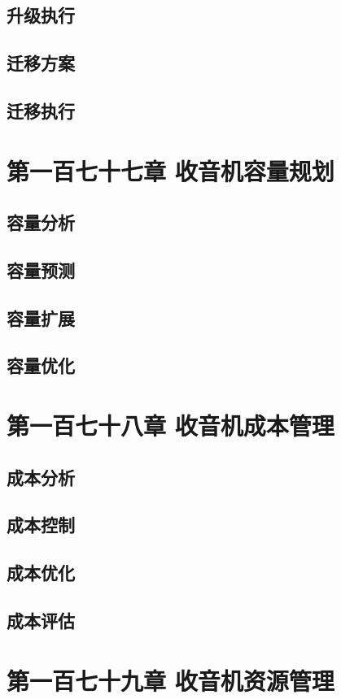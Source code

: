 \documentclass[12pt,UTF8]{ctexbook}
\begin{document}
\section{升级执行}
\section{迁移方案}
\section{迁移执行}

\chapter{第一百七十七章 收音机容量规划}

\section{容量分析}
\section{容量预测}
\section{容量扩展}
\section{容量优化}

\chapter{第一百七十八章 收音机成本管理}

\section{成本分析}
\section{成本控制}
\section{成本优化}
\section{成本评估}

\chapter{第一百七十九章 收音机资源管理}
\end{document}
